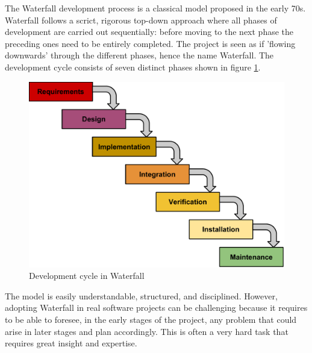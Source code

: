 The Waterfall development process is a classical model proposed in the early 70s.
Waterfall follows a scrict, rigorous top-down approach where all phases of development are
carried out sequentially: before moving to the next phase the preceding ones
need to be entirely completed. The project is seen as if 'flowing downwards'
through the different phases, hence the name Waterfall. The development cycle consists of seven
distinct phases shown in figure \ref{figure:waterfall-model}.

\begin{figure}[h]
\begin{center}
\includegraphics[scale=0.6]{../Figures/Waterfall-model.pdf}
\end{center}
\caption{Development cycle in Waterfall}
\label{figure:waterfall-model}
\end{figure}

The model is easily understandable, structured, and disciplined.
However, adopting Waterfall in real software projects can be challenging because it requires to be able to foresee,
in the early stages of the project, any problem that could arise in later stages and plan accordingly.
This is often a very hard task that requires great insight and expertise.

